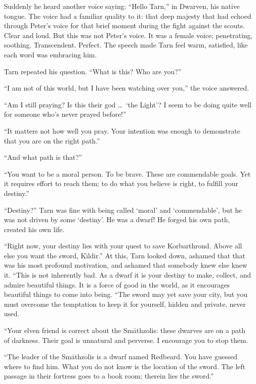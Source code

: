 Suddenly he heard another voice saying: ``Hello Tarn,''  in Dwarven, his native tongue.  The voice had a familiar quality to it: that deep majesty that had echoed through Peter's voice for that brief moment during the fight against the scouts.  Clear and loud.  But this was not Peter's voice.  It was a female voice; penetrating, soothing.  Transcendent.  Perfect.  The speech made Tarn feel warm, satisfied, like each word was embracing him.

Tarn repeated his question.  ``What is this?  Who are you?''

``I am not of this world, but I have been watching over you,'' the voice answered.

``Am I still praying?  Is this their god \ldots\ `the Light'?  I seem to be doing quite well for someone who's never prayed before!''

``It matters not how well you pray.  Your intention was enough to demonstrate that you are on the right path.''

``And what path is that?''

``You want to be a moral person.  To be brave.  These are commendable goals.  Yet it requires effort to reach them; to do what you believe is right, to fulfill your destiny.''

``Destiny?'' Tarn was fine with being called `moral' and `commendable', but he was not driven by some `destiny'.  He was a dwarf!  He forged his own path, created his own life.

``Right now, your destiny lies with your quest to save Korbarthrond.  Above all else you want the sword, K\=\i{}ldir.''  At this, Tarn looked down, ashamed that that was his most profound motivation, and ashamed that somebody knew else knew it.  ``This is not inherently bad.  As a dwarf it is your destiny to make, collect, and admire beautiful things.  It is a force of good in the world, as it encourages beautiful things to come into being.  ``The sword may yet save your city, but you must overcome the temptation to keep it for yourself, hidden and private, never used.

``Your elven friend is correct about the Sm\=athzolis: these dwarves are on a path of darkness.  Their goal is unnatural and perverse.  I encourage you to stop them.

``The leader of the Sm\=athzolis is a dwarf named Redbeard. You have guessed where to find him.  What you do not know is the location of the sword.  The left passage in their fortress goes to a book room; therein lies the sword.''

